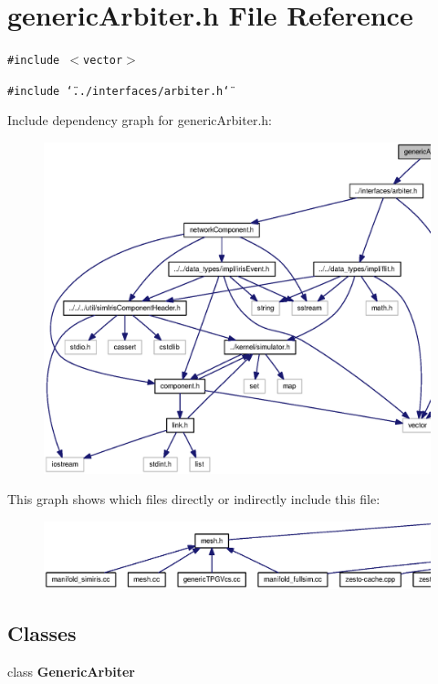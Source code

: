 \section{genericArbiter.h File Reference}
\label{genericArbiter_8h}
{\tt \#include $<$vector$>$}\par
{\tt \#include \char`\"{}../interfaces/arbiter.h\char`\"{}}\par


Include dependency graph for genericArbiter.h:\nopagebreak
\begin{figure}[H]
\begin{center}
\leavevmode
\includegraphics[width=328pt]{genericArbiter_8h__incl}
\end{center}
\end{figure}


This graph shows which files directly or indirectly include this file:\nopagebreak
\begin{figure}[H]
\begin{center}
\leavevmode
\includegraphics[width=420pt]{genericArbiter_8h__dep__incl}
\end{center}
\end{figure}
\subsection*{Classes}
\begin{CompactItemize}
\item 
class {\bf GenericArbiter}
\end{CompactItemize}
